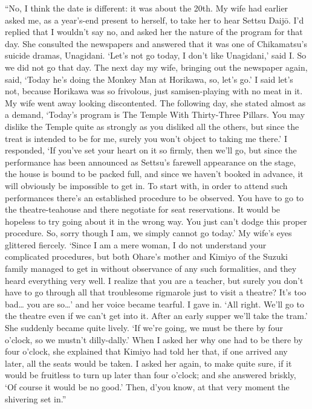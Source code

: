 \documentclass[12pt, openright]{book}
\begin{document}
``No, I think the date is different: it was about the 20th. My wife had
earlier asked me, as a year's-end present to herself, to take her to
hear Settsu Daijō. I'd replied that I wouldn't say no, and asked her the
nature of the program for that day. She consulted the newspapers and
answered that it was one of Chikamatsu's suicide dramas, Unagidani.
`Let's not go today, I don't like Unagidani,' said I. So we did not go
that day. The next day my wife, bringing out the newspaper again, said,
`Today he's doing the Monkey Man at Horikawa, so, let's go.' I said
let's not, because Horikawa was so frivolous, just samisen-playing with
no meat in it. My wife went away looking discontented. The following
day, she stated almost as a demand, `Today's program is The Temple With
Thirty-Three Pillars. You may dislike the Temple quite as strongly as
you disliked all the others, but since the treat is intended to be for
me, surely you won't object to taking me there.' I responded, `If you've
set your heart on it so firmly, then we'll go, but since the performance
has been announced as Settsu's farewell appearance on the stage, the
house is bound to be packed full, and since we haven't booked in
advance, it will obviously be impossible to get in. To start with, in
order to attend such performances there's an established procedure to be
observed. You have to go to the theatre-teahouse and there negotiate for
seat reservations. It would be hopeless to try going about it in the
wrong way. You just can't dodge this proper procedure. So, sorry though
I am, we simply cannot go today.' My wife's eyes glittered fiercely.
`Since I am a mere woman, I do not understand your complicated
procedures, but both Ohare's mother and Kimiyo of the Suzuki family
managed to get in without observance of any such formalities, and they
heard everything very well. I realize that you are a teacher, but surely
you don't have to go through all that troublesome rigmarole just to
visit a theatre? It's too bad\ldots{} you are so\ldots{}' and her voice
became tearful. I gave in. `All right. We'll go to the theatre even if
we can't get into it. After an early supper we'll take the tram.' She
suddenly became quite lively. `If we're going, we must be there by four
o'clock, so we mustn't dilly-dally.' When I asked her why one had to be
there by four o'clock, she explained that Kimiyo had told her that, if
one arrived any later, all the seats would be taken. I asked her again,
to make quite sure, if it would be fruitless to turn up later than four
o'clock; and she answered briskly, `Of course it would be no good.'
Then, d'you know, at that very moment the shivering set in.''
\end{document}

